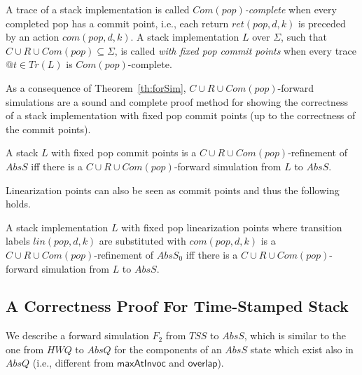 A trace of a stack implementation is called \emph{$Com(pop)$-complete} when every completed pop has a commit point, i.e., each return $ret(pop,d,k)$ is preceded by an action $com(pop,d,k)$. A stack implementation $L$ over $\Sigma$, such that $C\cup R\cup Com(pop)\subseteq \Sigma$, is called \emph{with fixed pop commit points} when every trace $@t\in Tr(L)$ is $Com(pop)$-complete.


As a consequence of Theorem~\ref{th:forSim}, $C\cup R\cup Com(pop)$-forward simulations are a sound and complete proof method for showing the correctness of a stack implementation with fixed pop commit points (up to the correctness of the commit points).


\vspace{-1mm}
\begin{corollary}
A stack $L$ with fixed pop commit points is a $C\cup R\cup Com(pop)$-refinement of $AbsS$ if{f} there is a $C\cup R\cup Com(pop)$-forward simulation from $L$ to $AbsS$.
\vspace{-1mm}
\end{corollary}

Linearization points can also be seen as commit points and thus the following holds.

\vspace{-1mm}
\begin{corollary}
A stack implementation $L$ with fixed pop linearization points where transition labels $lin(pop,d,k)$ are substituted with $com(pop,d,k)$ is a $C\cup R\cup Com(pop)$-refinement of $AbsS_0$ if{f} there is a $C\cup R\cup Com(pop)$-forward simulation from $L$ to $AbsS$.
\vspace{-1mm}
\end{corollary}


\vspace{-2.5mm}
\subsection{A Correctness Proof For Time-Stamped Stack}\label{sec:corr_tss}
We describe a forward simulation $F_2$ from $\mathit{TSS}$ to $AbsS$, which is similar to the one from $\mathit{HWQ}$ to $AbsQ$ for the components of an $AbsS$ state which exist also in $AbsQ$ (i.e., different from $\mathsf{maxAtInvoc}$ and $\mathsf{overlap}$).

